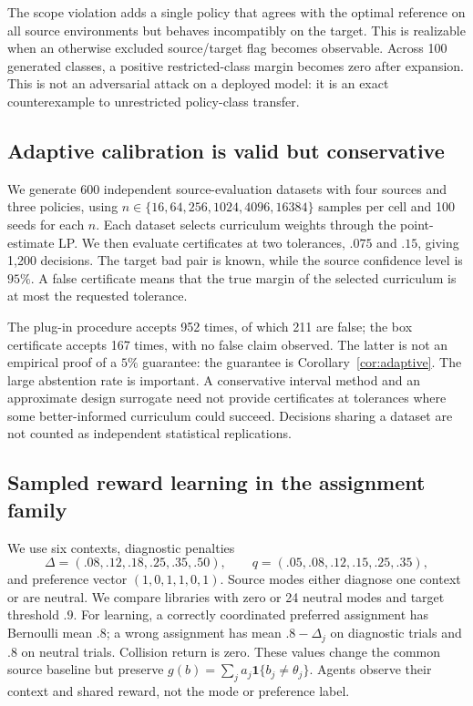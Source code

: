 \documentclass[11pt]{article}
\theoremstyle{definition}\newtheorem{definition}[theorem]{Definition}
\newcommand{\1}{\mathbf{1}}
\begin{document}
The scope violation adds a single policy that agrees with the optimal reference on all source environments but behaves incompatibly on the target. This is realizable when an otherwise excluded source/target flag becomes observable. Across 100 generated classes, a positive restricted-class margin becomes zero after expansion. This is not an adversarial attack on a deployed model: it is an exact counterexample to unrestricted policy-class transfer.

\subsection{Adaptive calibration is valid but conservative}
We generate 600 independent source-evaluation datasets with four sources and three policies, using $n\in\{16,64,256,1024,4096,16384\}$ samples per cell and 100 seeds for each $n$. Each dataset selects curriculum weights through the point-estimate LP. We then evaluate certificates at two tolerances, $.075$ and $.15$, giving 1,200 decisions. The target bad pair is known, while the source confidence level is $95\%$. A false certificate means that the true margin of the selected curriculum is at most the requested tolerance.

The plug-in procedure accepts 952 times, of which 211 are false; the box certificate accepts 167 times, with no false claim observed. The latter is not an empirical proof of a $5\%$ guarantee: the guarantee is Corollary~\ref{cor:adaptive}. The large abstention rate is important. A conservative interval method and an approximate design surrogate need not provide certificates at tolerances where some better-informed curriculum could succeed. Decisions sharing a dataset are not counted as independent statistical replications.

\begin{table}[t]
\centering\small
\caption{Calibration totals, pooling two tolerance queries per dataset. ``False'' is measured against exact ground-truth source values. The box certifies substantially less often; this cost is not hidden by reporting only error rates.}
\label{tab:calibration}
\end{table}

\subsection{Sampled reward learning in the assignment family}
We use six contexts, diagnostic penalties
\begin{equation*}
 \Delta=(.08,.12,.18,.25,.35,.50),\qquad
 q=(.05,.08,.12,.15,.25,.35),
\end{equation*}
and preference vector $(1,0,1,1,0,1)$. Source modes either diagnose one context or are neutral. We compare libraries with zero or 24 neutral modes and target threshold $.9$. For learning, a correctly coordinated preferred assignment has Bernoulli mean $.8$; a wrong assignment has mean $.8-\Delta_j$ on diagnostic trials and $.8$ on neutral trials. Collision return is zero. These values change the common source baseline but preserve $g(b)=\sum_ja_j\1\{b_j\ne\theta_j\}$. Agents observe their context and shared reward, not the mode or preference label.
\end{document}
